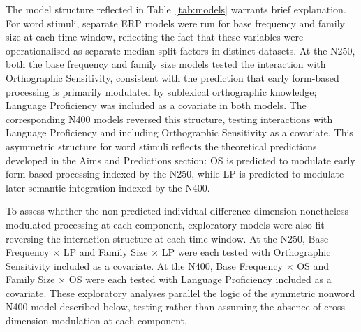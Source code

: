 \documentclass[utf8]{FrontiersinHarvard} %
\begin{document}
	The model structure reflected in Table~\ref{tab:models} warrants brief explanation. For word stimuli, separate ERP models were run for base frequency and family size at each time window, reflecting the fact that these variables were operationalised as separate median-split factors in distinct datasets. At the N250, both the base frequency and family size models tested the interaction with Orthographic Sensitivity, consistent with the prediction that early form-based processing is primarily modulated by sublexical orthographic knowledge; Language Proficiency was included as a covariate in both models. The corresponding N400 models reversed this structure, testing interactions with Language Proficiency and including Orthographic Sensitivity as a covariate. This asymmetric structure for word stimuli reflects the theoretical predictions developed in the Aims and Predictions section: OS is predicted to modulate early form-based processing indexed by the N250, while LP is predicted to modulate later semantic integration indexed by the N400.

	To assess whether the non-predicted individual difference dimension nonetheless modulated processing at each component, exploratory models were also fit reversing the interaction structure at each time window. At the N250, Base Frequency $\times$ LP and Family Size $\times$ LP were each tested with Orthographic Sensitivity included as a covariate. At the N400, Base Frequency $\times$ OS and Family Size $\times$ OS were each tested with Language Proficiency included as a covariate. These exploratory analyses parallel the logic of the symmetric nonword N400 model described below, testing rather than assuming the absence of cross-dimension modulation at each component.
	
\end{document}
